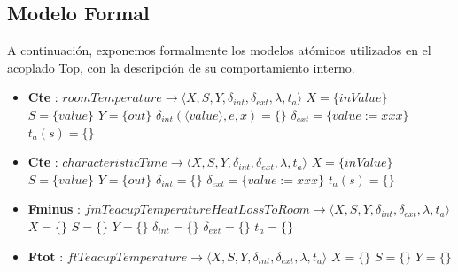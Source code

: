 \subsection{Modelo Formal}
A continuación, exponemos formalmente los modelos atómicos utilizados en el acoplado Top, con la descripción de su comportamiento interno.
\begin{itemize}
\item \textbf{Cte} : $ roomTemperature \rightarrow \langle X, S, Y, \delta_{int}, \delta_{ext}, \lambda, t_{a} \rangle$ \newline
$ X = \{ inValue \} $ \newline
$ S = \{ value \} $ \newline
$ Y = \{ out \} $ \newline
$ \delta_{int}(\langle value \rangle, e, x) = \{ \} $ \newline
$ \delta_{ext} = \{ value := xxx \} $ \newline
$ t_{a}(s) = \{ \} $ 
\item \textbf{Cte} : $ characteristicTime \rightarrow \langle X, S, Y, \delta_{int}, \delta_{ext}, \lambda, t_{a} \rangle$ \newline
$ X = \{ inValue \} $ \newline
$ S = \{ value \} $ \newline
$ Y = \{ out \} $ \newline
$ \delta_{int} = \{ \} $ \newline
$ \delta_{ext} = \{ value := xxx \} $ \newline
$ t_{a}(s) = \{ \} $ 
\item \textbf{Fminus} : $ fmTeacupTemperatureHeatLossToRoom \rightarrow \langle X, S, Y, \delta_{int}, \delta_{ext}, \lambda, t_{a} \rangle$ \newline
$ X = \{ \} $ \newline
$ S = \{ \} $ \newline
$ Y = \{ \} $ \newline
$ \delta_{int} = \{ \} $ \newline
$ \delta_{ext} = \{ \} $ \newline
$ t_{a} = \{ \} $ 
\item \textbf{Ftot} : $ ftTeacupTemperature \rightarrow \langle X, S, Y, \delta_{int}, \delta_{ext}, \lambda, t_{a} \rangle$ \newline
$ X = \{ \} $ \newline
$ S = \{ \} $ \newline
$ Y = \{ \} $ \newline

\end{itemize}
